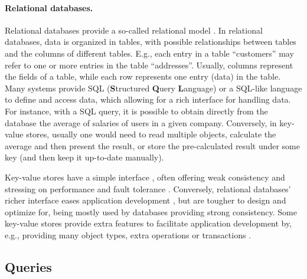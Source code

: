 \paragraph{Relational databases.}
Relational databases provide a so-called relational model \cite{spanner, eiger, noria}.
In relational databases, data is organized in tables, with possible relationships between tables and the columns of different tables.
E.g., each entry in a table ``customers'' may refer to one or more entries in the table ``addresses''.
Usually, columns represent the fields of a table, while each row represents one entry (data) in the table.
Many systems provide SQL (\textbf{S}tructured \textbf{Q}uery \textbf{L}anguage) or a SQL-like language \cite{sequel, spanner, noria, mongoVScassandra} to define and access data, which allowing for a rich interface for handling data. %
For instance, with a SQL query, it is possible to obtain directly from the database the average of salaries of users in a given company.
Conversely, in key-value stores, usually one would need to read multiple objects, calculate the average and then present the result, or store the pre-calculated result under some key (and then keep it up-to-date manually).

Key-value stores have a simple interface \cite{dynamo}, often offering weak consistency and stressing on performance and fault tolerance \cite{dynamo, cops, cure}.
Conversely, relational databases' richer interface eases application development \cite{spanner, noria, eiger}, but are tougher to design and optimize for, being mostly used by databases providing strong consistency.
Some key-value stores provide extra features to facilitate application development by, e.g., providing many object types, extra operations or transactions \cite{cure, walter}.


\subsection{Queries}
\label{subsec:queries}

